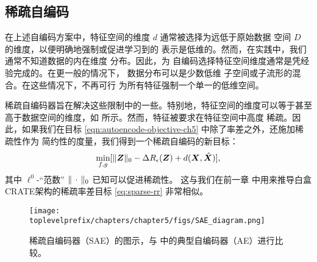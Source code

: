 \documentclass[../../book-main.tex]{subfiles}
\begin{document}
\subsection{稀疏自编码}
在上述自编码方案中，特征空间的维度
$d$ 通常被选择为远低于原始数据
空间 $D$ 的维度，以便明确地强制或促进学习到的
表示是低维的。然而，在实践中，我们
通常不知道数据的内在维度
分布。因此，为
自编码选择特征空间维度通常是凭经验完成的。在更一般的情况下，
数据分布可以是少数低维
子空间或子流形的混合。在这些情况下，不再可行
为所有特征强制一个单一的低维空间。

稀疏自编码器旨在解决这些限制中的一些。特别地，特征空间的维度可以等于甚至
高于数据空间的维度，如
 所示。然而，特征被要求在特征空间中高度
稀疏。因此，如果我们在目标
\eqref{eqn:autoencode-objective-ch5} 中除了率差之外，还施加稀疏性作为
简约性的度量，我们得到一个稀疏自编码的新目标：
\begin{equation}
  \min_{f, g}
  [\|\bm{Z}\|_0 - \Delta R_{\epsilon}(\bm{Z}) + d(\bm{X}, \hat {\bm{X}})],
  \label{eqn:autoencode-sparse}
\end{equation}
其中 $\ell^0$-“范数” $\|\,\cdot\,\|_0$ 已知可以促进稀疏性。
这与我们在前一章  中用来推导白盒CRATE架构的稀疏率差目标
\eqref{eq:sparse-rr} 非常相似。

\begin{figure}
  \centering
  \texttt{[image: \\toplevelprefix/chapters/chapter5/figs/SAE\_diagram.png]}
  \caption{稀疏自编码器（SAE）的图示，与
   中的典型自编码器（AE）进行比较。}
  \label{fig:SAE}
\end{figure}

\end{document}

